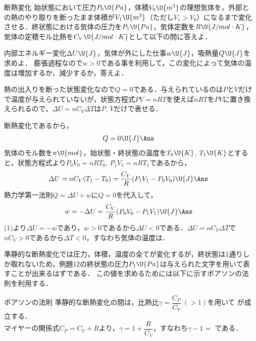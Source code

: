 \bsNeed{64mm}
\begin{reidaiunit}
\begin{reidai}{断熱変化}
\hspace{1zw}始状態において圧力$P_0\U{Pa}$，体積$V_0\U{m^3}$の理想気体を，外部との熱のやり取りを断ったまま体積が$V_1\U{m^3}$（ただし$V_1>V_0$）になるまで変化させる．終状態における気体の圧力を$P_1\U{Pa}$，気体定数を$R\U{J/mol\cdot K}$，気体の定積モル比熱を$C_V\U{J/mol\cdot K}$として以下の問に答えよ．
\begin{komon}
 内部エネルギー変化$\Delta U\U{J}$，気体が外にした仕事$w\U{J}$，吸熱量$Q\U{J}$を求めよ．
 膨張過程なので$w>0$である事を利用して，この変化によって気体の温度は増加するか，減少するか，答えよ．
\end{komon}
\end{reidai}

\begin{sisinE}
熱の出入りを断った状態変化なので$Q=0$である．与えられているのは$P$と$V$だけで温度が与えられていないが，状態方程式$PV=nRT$を使えば$nRT$を$PV$に置き換えられるので，$\Delta U=nC_V\Delta T$は$P$, $V$だけで表せる．
\end{sisinE}

\begin{kaitou}
\begin{komon}
 断熱変化であるから，
       \[Q=0\U{J}\Ans\]
       気体のモル数を$n\U{mol}$，始状態・終状態の温度を$T_0\U{K}$, $T_1\U{K}$とすると，状態方程式より$P_0V_0=nRT_0$, $P_1V_1=nRT_1$であるから，
       \[\Delta U=nC_V(T_1-T_0)=\frac{C_V}{R}(P_1V_1-P_0V_0)\U{J}\Ans\]
       熱力学第一法則$Q=\Delta U+w$に$Q=0$を代入して，
       \[w=-\Delta U=\frac{C_V}{R}(P_0V_0-P_1V_1)\U{J}\Ans\]
 (1)より$\Delta U=-w$であり，$w>0$であるから$\Delta U<0$である．$\Delta U=nC_V\Delta T$で$nC_V>0$であるから$\Delta T<0$，すなわち気体の温度は．\hspace*{\fill}\Ans
\end{komon}
\end{kaitou}
\end{reidaiunit}

準静的な断熱変化では圧力，体積，温度の全てが変化するが，終状態は1通りしか取れないため，例題12の終状態の圧力$P_1\U{Pa}$は与えられた文字を用いて表すことが出来るはずである．
この値を求めるためには以下に示す{\gtfamily ポアソンの法則}を利用する．

\bsNeed{40mm}
\begin{matome}{ポアソンの法則}
 \hspace{3mm} 準静的な断熱変化の間は，比熱比$\gamma=\dfrac{C_P}{C_V}\ (>1)$を用いて
 が成立する．\\[0.5mm]
 \hspace{3mm} マイヤーの関係式$C_P=C_V+R$より，$\gamma=1+\dfrac{R}{C_V}$，すなわち$\gamma-1=$\,\,である．
\end{matome}

